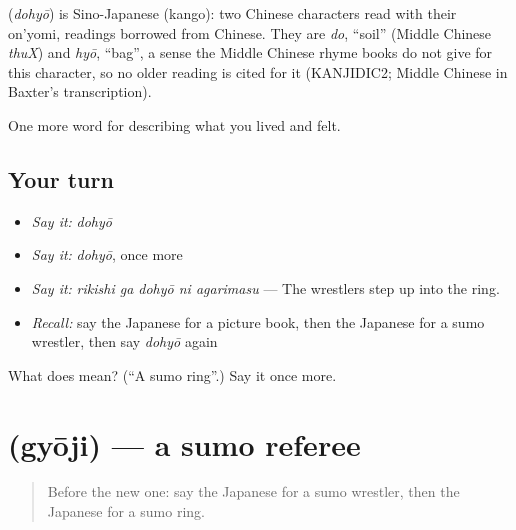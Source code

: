 \begin{cousinweb}
\textbf{} (\emph{dohyō}) is Sino-Japanese (kango): two Chinese characters read with their on'yomi, readings borrowed from Chinese. They are \emph{do}, \textquotedblleft{}soil\textquotedblright{} (Middle Chinese \emph{thuX}) and \emph{hyō}, \textquotedblleft{}bag\textquotedblright{}, a sense the Middle Chinese rhyme books do not give for this character, so no older reading is cited for it (KANJIDIC2; Middle Chinese in Baxter's transcription).
\end{cousinweb}

\begin{grammarlens}[title={What you've built}]
One more word for describing what you lived and felt.
\end{grammarlens}

\subsection*{Your turn}
\begin{itemize}
\raggedright
  \item \emph{Say it:} \emph{dohyō}
  \item \emph{Say it:} \emph{dohyō}, once more
  \item \emph{Say it:} \emph{rikishi ga dohyō ni agarimasu} — The wrestlers step up into the ring.
  \item \emph{Recall:} say the Japanese for a picture book, then the Japanese for a sumo wrestler, then say \emph{dohyō} again
\end{itemize}

\begin{tcolorbox}[breakable,colback=teal!4,colframe=teal!35!black,title={Before you move on}]
What does  mean? (\textquotedblleft{}A sumo ring\textquotedblright{}.) Say it once more.
\end{tcolorbox}
\section[\texorpdfstring{\ja{ぎょうじ} (gyōji)}{ぎょうじ (gyōji)}]{ (gyōji) — a sumo referee}

\label{lesson:JA-C505-gyouji}



\begin{quote}
Before the new one: say the Japanese for a sumo wrestler, then the Japanese for a sumo ring.
\end{quote}

